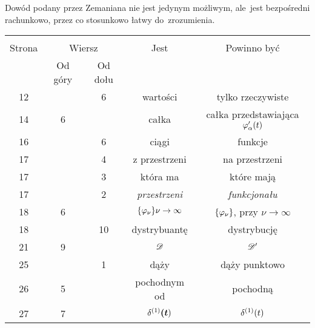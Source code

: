 \documentclass[a4paper,11pt]{article}
\begin{document}
Dowód podany przez Zemaniana nie jest jedynym możliwym, ale~jest
bezpośredni rachunkowo, przez co stosunkowo łatwy do~zrozumienia.

\newpage
{}
\begin{center}
  \begin{tabular}{|c|c|c|c|c|}
    \hline
    & \multicolumn{2}{c|}{} & & \\
    Strona & \multicolumn{2}{c|}{Wiersz} & Jest
                              & Powinno być \\ \cline{2-3}
    & Od góry & Od dołu & & \\
    \hline
    12  & &  6 & wartości & tylko rzeczywiste \\
    14  &  6 & & całka & całka przedstawiająca $\varphi_{ \alpha }'( t )$ \\
    16  & &  6 & ciągi & funkcje \\
    17  & &  4 & z przestrzeni & na przestrzeni \\
    17  & &  3 & która ma & które mają \\
    17  & &  2 & \emph{przestrzeni} & \emph{funkcjonału} \\
    18  &  6 & & $\{ \varphi_{ \nu } \}\nu \to \infty$
           & $\{ \varphi_{ \nu } \}$, przy $\nu \to \infty$ \\
    18  & & 10 & dystrybuantę & dystrybucję \\
    21  &  9 & & $\mathcal{D}$ & $\mathcal{D}'$ \\
    25  & &  1 & dąży & dąży punktowo \\
    26  &  5 & & pochodnym od & pochodną \\
    27  &  7 & & $\delta^{ ( 1 ) }\boldsymbol{ ( t } )$ & $\delta^{ ( 1 ) }( t )$ \\

\end{tabular}
\end{center}
\end{document}
